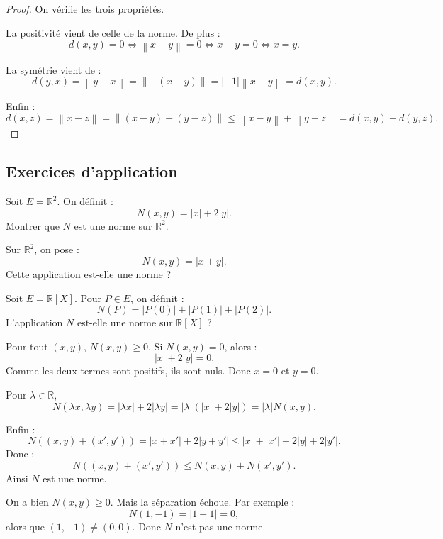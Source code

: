 \documentclass[11pt,a4paper]{article}
\newcommand{\R}{\mathbb R}
\newcommand{\norme}[1]{\left\lVert #1 \right\rVert}
\begin{document}
\begin{proof}
On vérifie les trois propriétés.

La positivité vient de celle de la norme.  
De plus :
\[
d(x,y)=0 \Longleftrightarrow \norme{x-y}=0
\Longleftrightarrow x-y=0
\Longleftrightarrow x=y.
\]

La symétrie vient de :
\[
d(y,x)=\norme{y-x}
=\norme{-(x-y)}
=|-1|\norme{x-y}
=d(x,y).
\]

Enfin :
\[
d(x,z)=\norme{x-z}
=\norme{(x-y)+(y-z)}
\leq \norme{x-y}+\norme{y-z}
=d(x,y)+d(y,z).
\]
\end{proof}

\subsection{Exercices d'application}

\begin{exercicebox}
Soit \(E=\R^2\). On définit :
\[
N(x,y)=|x|+2|y|.
\]
Montrer que \(N\) est une norme sur \(\R^2\).
\end{exercicebox}

\begin{exercicebox}
Sur \(\R^2\), on pose :
\[
N(x,y)=|x+y|.
\]
Cette application est-elle une norme ?
\end{exercicebox}

\begin{exercicebox}
Soit \(E=\R[X]\). Pour \(P\in E\), on définit :
\[
N(P)=|P(0)|+|P(1)|+|P(2)|.
\]
L'application \(N\) est-elle une norme sur \(\R[X]\) ?
\end{exercicebox}

\begin{correctionbox}[1]
Pour tout \((x,y)\), \(N(x,y)\geq 0\).  
Si \(N(x,y)=0\), alors :
\[
|x|+2|y|=0.
\]
Comme les deux termes sont positifs, ils sont nuls. Donc \(x=0\) et \(y=0\).

Pour \(\lambda\in\R\),
\[
N(\lambda x,\lambda y)
=|\lambda x|+2|\lambda y|
=|\lambda|(|x|+2|y|)
=|\lambda|N(x,y).
\]

Enfin :
\[
N((x,y)+(x',y'))
=|x+x'|+2|y+y'|
\leq |x|+|x'|+2|y|+2|y'|.
\]
Donc :
\[
N((x,y)+(x',y'))\leq N(x,y)+N(x',y').
\]
Ainsi \(N\) est une norme.
\end{correctionbox}

\begin{correctionbox}[2]
On a bien \(N(x,y)\geq 0\).  
Mais la séparation échoue. Par exemple :
\[
N(1,-1)=|1-1|=0,
\]
alors que \((1,-1)\neq(0,0)\).  
Donc \(N\) n'est pas une norme.
\end{correctionbox}
\end{document}
